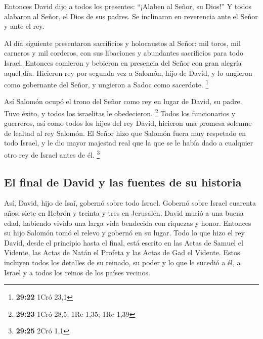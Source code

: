  Entonces David dijo a todos los presentes: ``¡Alaben al
Señor, su Dios!'' Y todos alabaron al Señor, el Dios de sus padres. Se
inclinaron en reverencia ante el Señor y ante el rey.

 Al día siguiente presentaron sacrificios y holocaustos
al Señor: mil toros, mil carneros y mil corderos, con sus libaciones y
abundantes sacrificios para todo Israel.  Entonces
comieron y bebieron en presencia del Señor con gran alegría aquel día.
Hicieron rey por segunda vez a Salomón, hijo de David, y lo ungieron
como gobernante del Señor, y ungieron a Sadoc como sacerdote.
\footnote{\textbf{29:22} 1Cró 23,1}

 Así Salomón ocupó el trono del Señor como rey en lugar
de David, su padre. Tuvo éxito, y todos los israelitas le obedecieron.
\footnote{\textbf{29:23} 1Cró 28,5; 1Re 1,35; 1Re 1,39} 
Todos los funcionarios y guerreros, así como todos los hijos del rey
David, hicieron una promesa solemne de lealtad al rey Salomón.
 El Señor hizo que Salomón fuera muy respetado en todo
Israel, y le dio mayor majestad real que la que se le había dado a
cualquier otro rey de Israel antes de él. \footnote{\textbf{29:25} 2Cró
  1,1}

\hypertarget{el-final-de-david-y-las-fuentes-de-su-historia}{%
\subsection{El final de David y las fuentes de su
historia}\label{el-final-de-david-y-las-fuentes-de-su-historia}}

 Así, David, hijo de Isaí, gobernó sobre todo Israel.
 Gobernó sobre Israel cuarenta años: siete en Hebrón y
treinta y tres en Jerusalén.  David murió a una buena
edad, habiendo vivido una larga vida bendecida con riquezas y honor.
Entonces su hijo Salomón tomó el relevo y gobernó en su lugar.
 Todo lo que hizo el rey David, desde el principio hasta
el final, está escrito en las Actas de Samuel el Vidente, las Actas de
Natán el Profeta y las Actas de Gad el Vidente.  Estos
incluyen todos los detalles de su reinado, su poder y lo que le sucedió
a él, a Israel y a todos los reinos de los países vecinos.
